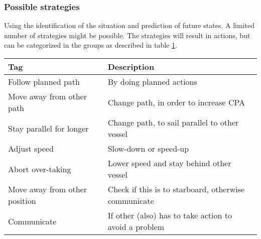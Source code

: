 \subsubsection{Possible strategies}
Using the identification of the situation and prediction of future states. A limited number of strategies might be possible. The strategies will result in actions, but can be categorized in the groups as described in table \ref{tab:strategies}.
\begin{table}[H]
	\begin{tabular}{p{}|p{}}
		\toprule
		Tag & Description\\
		\midrule
		Follow planned path & By doing planned actions \\
		Move away from other path & Change path, in order to increase CPA\\
		Stay parallel for longer & Change path, to sail parallel to other vessel \\
		Adjust speed & Slow-down or speed-up\\
		Abort over-taking & Lower speed and stay behind other vessel \\
		Move away from other position & Check if this is to starboard, otherwise communicate \\
		Communicate & If other (also) has to take action to avoid a problem \\
		\bottomrule
	\end{tabular}
	
	\label{tab:strategies}
\end{table}

